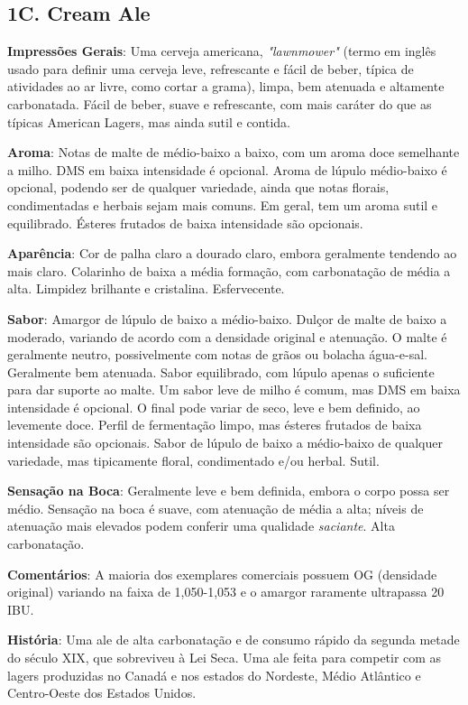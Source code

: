 \subsection*{1C. Cream Ale}
\textbf{Impressões Gerais}: Uma cerveja americana, \textit{"lawnmower"} (termo em inglês usado para definir uma cerveja leve, refrescante e fácil de beber, típica de atividades ao ar livre, como cortar a grama), limpa, bem atenuada e altamente carbonatada. Fácil de beber, suave e refrescante, com mais caráter do que as típicas American Lagers, mas ainda sutil e contida.

\textbf{Aroma}: Notas de malte de médio-baixo a baixo, com um aroma doce semelhante a milho. DMS em baixa intensidade é opcional. Aroma de lúpulo médio-baixo é opcional, podendo ser de qualquer variedade, ainda que notas florais, condimentadas e herbais sejam mais comuns. Em geral, tem um aroma sutil e equilibrado. Ésteres frutados de baixa intensidade são opcionais.

\textbf{Aparência}: Cor de palha claro a dourado claro, embora geralmente tendendo ao mais claro. Colarinho de baixa a média formação, com carbonatação de média a alta. Limpidez brilhante e cristalina. Esfervecente.

\textbf{Sabor}: Amargor de lúpulo de baixo a médio-baixo. Dulçor de malte de baixo a moderado, variando de acordo com a densidade original e atenuação. O malte é geralmente neutro, possivelmente com notas de grãos ou bolacha água-e-sal. Geralmente bem atenuada. Sabor equilibrado, com lúpulo apenas o suficiente para dar suporte ao malte. Um sabor leve de milho é comum, mas DMS em baixa intensidade é opcional. O final pode variar de seco, leve e bem definido, ao levemente doce. Perfil de fermentação limpo, mas ésteres frutados de baixa intensidade são opcionais. Sabor de lúpulo de baixo a médio-baixo de qualquer variedade, mas tipicamente floral, condimentado e/ou herbal. Sutil.

\textbf{Sensação na Boca}: Geralmente leve e bem definida, embora o corpo possa ser médio. Sensação na boca é suave, com atenuação de média a alta; níveis de atenuação mais elevados podem conferir uma qualidade \textit{saciante}. Alta carbonatação.

\textbf{Comentários}: A maioria dos exemplares comerciais possuem OG (densidade original) variando na faixa de 1,050-1,053 e o amargor raramente ultrapassa 20 IBU.

\textbf{História}: Uma ale de alta carbonatação e de consumo rápido da segunda metade do século XIX, que sobreviveu à Lei Seca. Uma ale feita para competir com as lagers produzidas no Canadá e nos estados do Nordeste, Médio Atlântico e Centro-Oeste dos Estados Unidos.

